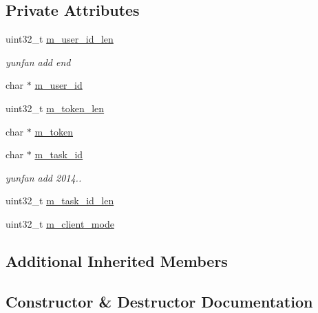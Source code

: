 \subsection*{Private Attributes}
\begin{DoxyCompactItemize}
\item 
uint32\+\_\+t \hyperlink{class_c_im_pdu_client_file_login_req_a58bae7775536d2dae8feba8826b66539}{m\+\_\+user\+\_\+id\+\_\+len}
\begin{DoxyCompactList}\small\item\em yunfan add end \end{DoxyCompactList}\item 
char $\ast$ \hyperlink{class_c_im_pdu_client_file_login_req_a7dbf18d3e55c5b33fc94a2c0306a2192}{m\+\_\+user\+\_\+id}
\item 
uint32\+\_\+t \hyperlink{class_c_im_pdu_client_file_login_req_abec49834913f789ed59eb8a9f76a7425}{m\+\_\+token\+\_\+len}
\item 
char $\ast$ \hyperlink{class_c_im_pdu_client_file_login_req_aa6aba35f517007ad923ec783936f5b7d}{m\+\_\+token}
\item 
char $\ast$ \hyperlink{class_c_im_pdu_client_file_login_req_a9b4ea1ccb46ffffdc016d91f11090143}{m\+\_\+task\+\_\+id}
\begin{DoxyCompactList}\small\item\em yunfan add 2014.. \end{DoxyCompactList}\item 
uint32\+\_\+t \hyperlink{class_c_im_pdu_client_file_login_req_af4ea67a66c220592b39ed09d25b4adcd}{m\+\_\+task\+\_\+id\+\_\+len}
\item 
uint32\+\_\+t \hyperlink{class_c_im_pdu_client_file_login_req_aeed3094d81a3de600638e6a880593961}{m\+\_\+client\+\_\+mode}
\end{DoxyCompactItemize}
\subsection*{Additional Inherited Members}


\subsection{Constructor \& Destructor Documentation}
\hypertarget{class_c_im_pdu_client_file_login_req_a7d130773fe92eb4d6f036fc1ccce592c}{}
